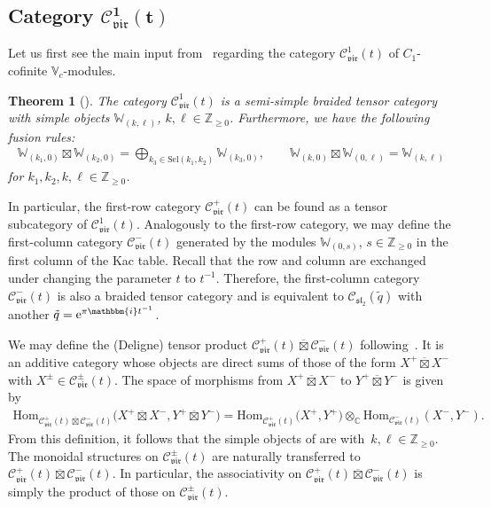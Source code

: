 \documentclass[10pt,a4paper]{amsart}
\numberwithin{equation}{section}
\newtheorem{thm}{Theorem}[section]
\newcommand{\Hom}{\mathrm{Hom}}
\newcommand{\TCprod}{\overline{\boxtimes}}
\newcommand{\bC}{\mathbb{C}}
\newcommand{\bZ}{\mathbb{Z}}
\newcommand{\cC}{\mathcal{C}}
\newcommand{\fsl}{\mathfrak{sl}}
\newcommand{\bbmi}{\mathbbm{i}}
\newcommand{\catQG}{\cC_{\fsl_{2}}}
\newcommand{\catVir}{\cC_{\vir}}
\newcommand{\Sel}{\mathrm{Sel}}
\newcommand{\virvoa}{\mathbb{V}}
\newcommand{\virmod}{\mathbb{W}}
\newcommand{\vir}{\mathfrak{vir}}
\begin{document}
\subsection[Category catVir\^1(t)]{Category $\boldsymbol{ \catVir^{1}(t)}$}
Let us first see the main input from~\cite{CJORY-tensor_categories_arising_from_Virasoro_algebra} regarding the category $\catVir^{1}(t)$
of $C_{1}$-cofinite $\virvoa_{c}$-modules.

\begin{thm}[\cite{CJORY-tensor_categories_arising_from_Virasoro_algebra}]
\label{thm:c1cat-tensor}
The category $\catVir^{1}(t)$ is a semi-simple braided tensor category with simple objects $\virmod_{(k,\ell)}$, $k,\ell\in \bZ_{\geq 0}$.
Furthermore, we have the following fusion rules:
\begin{align*}
	\virmod_{(k_{1},0)}\boxtimes\virmod_{(k_{2},0)} = \bigoplus_{k_{3}\in \Sel (k_{1},k_{2})}\virmod_{(k_{3},0)},\qquad
	\virmod_{(k,0)}\boxtimes\virmod_{(0,\ell)} = \virmod_{(k,\ell)}
\end{align*}
for $k_{1},k_{2},k,\ell\in\bZ_{\geq 0}$.
\end{thm}

In particular, the first-row category $\catVir^{+}(t)$ can be found as a tensor subcategory of $\catVir^{1}(t)$.
Analogously to the first-row category, we may define the first-column category $\catVir^{-}(t)$
generated by the modules $\virmod_{(0,s)}$, $s\in \bZ_{\geq 0}$ in the first column of the Kac table.
Recall that the row and column are exchanged under changing the parameter $t$ to $t^{-1}$.
Therefore, the first-column category $\catVir^{-}(t)$ is also a braided tensor category and is equivalent to
$\catQG (\tilde{q})$ with another ${\tilde{q} = {\rm e}^{\pi \bbmi t^{-1}}}$.

We may define the (Deligne) tensor product $\catVir^{+}(t) \TCprod\catVir^{-} (t)$ following~\cite[Section~4.6]{etingof2015tensor}.
It is an additive category whose objects are direct sums of those of the form $X^{+}\TCprod X^{-}$ with $X^{\pm}\in \catVir^{\pm}(t)$.
The space of morphisms from $X^{+}\TCprod X^{-}$ to $Y^{+}\TCprod Y^{-}$ is given by
\begin{gather*}
	\Hom_{\catVir^{+}(t)\TCprod\catVir^{-}(t)}\big(X^{+}\TCprod X^{-}, Y^{+}\TCprod Y^{-}\big) = \Hom_{\catVir^{+}(t)}\big(X^{+},Y^{+}\big)\otimes_{\bC} \Hom_{\catVir^{-}(t)}(X^{-},Y^{-}).
\end{gather*}
From this definition, it follows that the simple objects of \smash{$\catVir^{+}(t)\TCprod\catVir^{-}(t)$} are \smash{$\virmod_{(k,0)}\TCprod \virmod_{(0,\ell)}$} with~${k,\ell \in \bZ_{\geq 0}}$.
The monoidal structures on $\catVir^{\pm}(t)$ are naturally transferred to $\catVir^{+}(t)\TCprod\catVir^{-}(t)$.
In particular, the associativity on $\catVir^{+}(t)\TCprod\catVir^{-}(t)$ is simply the product of those on $\catVir^{\pm}(t)$.
\end{document}
